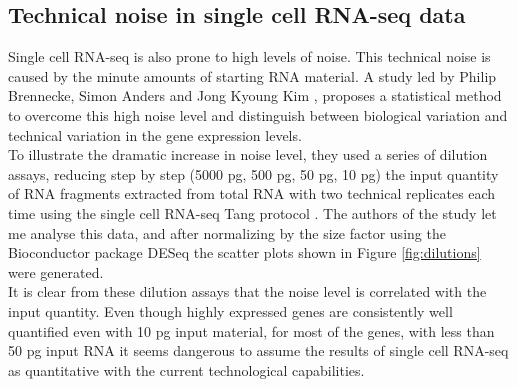   \subsection{Technical noise in single cell RNA-seq data}
  Single cell RNA-seq is also prone to high levels of noise. This technical noise is caused by the minute amounts of starting RNA material. A study led by Philip Brennecke, Simon Anders and Jong Kyoung Kim \cite{brennecke13}, proposes a statistical method to overcome this high noise level and distinguish between biological variation and technical variation in the gene expression levels.\\
  
  To illustrate the dramatic increase in noise level, they used a series of dilution assays, reducing step by step (5000 pg, 500 pg, 50 pg, 10 pg) the input quantity of RNA fragments extracted from total  RNA with two technical replicates each time using the single cell RNA-seq Tang protocol \cite{tang09}. The authors of the study let me analyse this data, and after normalizing by the size factor using the Bioconductor package DESeq \cite{anders10} the scatter plots shown in Figure \ref{fig:dilutions} were generated. \\
  
  It is clear from these dilution assays that the noise level is correlated with the input quantity. Even though highly expressed genes are consistently well quantified even with 10 pg input material, for most of the genes, with less than 50 pg input RNA it seems dangerous to assume the results of single cell RNA-seq as quantitative with the current technological capabilities.
  
